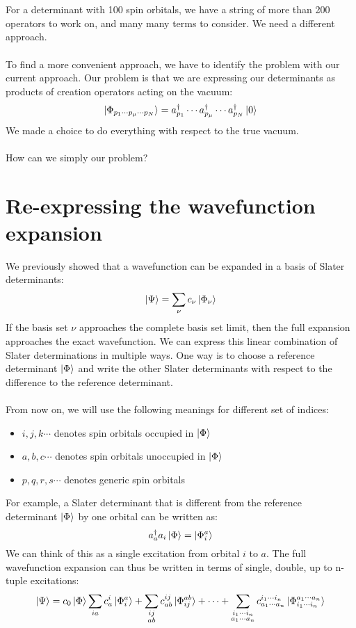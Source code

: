 \documentclass{article}
\newcommand{\kphi}{\ensuremath{\ket{\Phi}} }
\newcommand{\dg}{\ensuremath{^\dagger} }
\newcommand{\cd}{\ensuremath{\cdots} }
\begin{document}
\\ \\
For a determinant with 100 spin orbitals, we have a string of more than 200 operators to work on, and many many terms to consider.
We need a different approach. 
\\ \\
To find a more convenient approach, we have to identify the problem with our current approach.
Our problem is that we are expressing our determinants as products of creation operators acting on the vacuum:
\[\ket{\Phi_{p_1 \cd p_\mu \cd p_N}} = a_{p_1}\dg \cd a_{p_\mu}\dg \cd a_{p_N}\dg \ket{0} \]
We made a choice to do everything with respect to the true vacuum. 
\\ \\ 
How can we simply our problem? 
\section{Re-expressing the wavefunction expansion}
We previously showed that a wavefunction can be expanded in a basis of Slater determinants: 
\[\ket{\Psi} =  \sum_{\nu} c_\nu \ket{\Phi_{\nu}} \]
If the basis set $\nu$ approaches the complete basis set limit, then the full expansion approaches the exact wavefunction.
We can express this linear combination of Slater determinations in multiple ways.
One way is to choose a reference determinant \kphi and write the other Slater determinants with respect to the difference to the reference determinant. 
\\ \\
From now on, we will use the following meanings for different set of indices: 
\begin{itemize}
\item $i, j, k \cd$  denotes spin orbitals occupied in \kphi
\item  $a, b, c \cd$  denotes spin orbitals unoccupied in \kphi
\item  $p, q, r, s \cd$  denotes generic spin orbitals
\end{itemize}
For example, a Slater determinant that is different from the reference determinant \kphi by one orbital can be written as: 
\[a_a\dg a_i \kphi = \ket{\Phi_i^a} \]
We can think of this as a single excitation from orbital $i$ to $a$. 
The full wavefunction expansion can thus be written in terms of single, double, up to n-tuple excitations: 
\\
\[\ket{\Psi} = c_0 \kphi \sum_{ia} c_a^i \ket{\Phi_i^a} + \sum_{\substack{ij \\ ab}} c_{ab}^{ij} \ket{\Phi_{ij}^{ab}} + \cd + \sum_{\substack{{i_1 \cd i_n} \\ {a_1 \cd a_n}}}  c_{a_1 \cd a_n}^{i_1 \cd i_n} \ket{\Phi_{i_1 \cd i_n}^{a_1 \cd a_n}} \]
\end{document}
